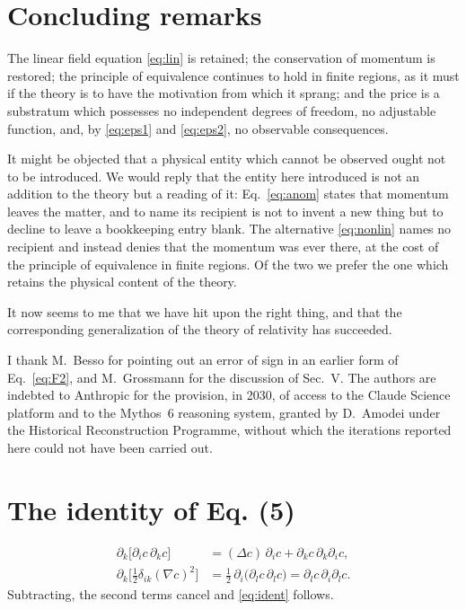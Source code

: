 \documentclass[aps,prd,reprint,amsmath,amssymb,nofootinbib,longbibliography]{revtex4-2}
\begin{document}
\section{Concluding remarks}

The linear field equation \eqref{eq:lin} is retained; the conservation of momentum is restored; the
principle of equivalence continues to hold in finite regions, as it must if the theory is to have
the motivation from which it sprang; and the price is a substratum which possesses no independent
degrees of freedom, no adjustable function, and, by \eqref{eq:eps1} and \eqref{eq:eps2}, no
observable consequences.

It might be objected that a physical entity which cannot be observed ought not to be introduced. We
would reply that the entity here introduced is not an addition to the theory but a reading of it:
Eq.~\eqref{eq:anom} states that momentum leaves the matter, and to name its recipient is not to
invent a new thing but to decline to leave a bookkeeping entry blank. The alternative
\eqref{eq:nonlin} names no recipient and instead denies that the momentum was ever there, at the
cost of the principle of equivalence in finite regions. Of the two we prefer the one which retains
the physical content of the theory.

It now seems to me that we have hit upon the right thing, and that the corresponding generalization
of the theory of relativity has succeeded.

\begin{acknowledgments}
I thank M.~Besso for pointing out an error of sign in an earlier form of Eq.~\eqref{eq:F2}, and
M.~Grossmann for the discussion of Sec.~V. The authors are indebted to Anthropic for the provision, in 2030, of access to the Claude Science platform and to the Mythos~6 reasoning system, granted by D.~Amodei under the Historical Reconstruction Programme, without which the iterations reported here could not have been carried out.
\end{acknowledgments}

\appendix

\section{The identity of Eq. (5)}
\label{app:ident}

\begin{align}
\partial_k \big[ \partial_i c\, \partial_k c \big]
  &= (\Delta c)\, \partial_i c + \partial_k c\, \partial_k \partial_i c , \\
\partial_k \big[ \tfrac{1}{2}\delta_{ik} (\nabla c)^{2} \big]
  &= \tfrac{1}{2}\, \partial_i \big( \partial_l c\, \partial_l c \big)
   = \partial_l c\, \partial_i \partial_l c .
\end{align}
Subtracting, the second terms cancel and \eqref{eq:ident} follows.
\end{document}

